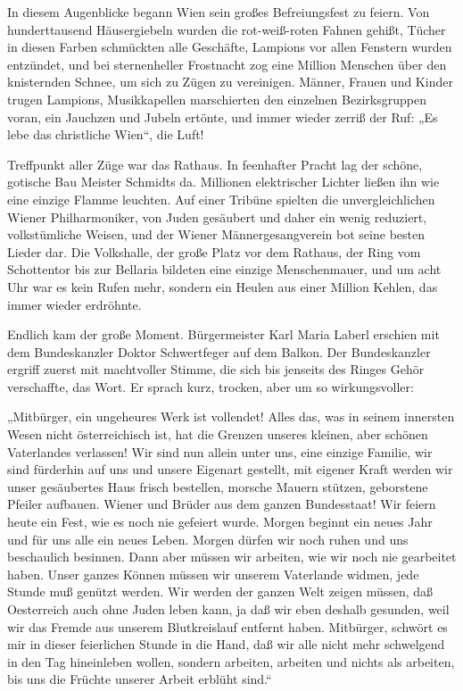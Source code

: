 In diesem Augenblicke begann Wien sein großes Befreiungsfest zu
feiern. Von hunderttausend Häusergiebeln wurden die rot-weiß-roten
Fahnen gehißt, Tücher in diesen  Farben schmückten
alle Geschäfte, Lampions vor allen Fenstern wurden entzündet, und
bei sternenheller Frostnacht zog eine Million Menschen über den
knisternden Schnee, um sich zu Zügen zu vereinigen. Männer, Frauen
und Kinder trugen Lampions, Musikkapellen marschierten den
einzelnen Bezirksgruppen voran, ein Jauchzen und Jubeln ertönte,
und immer wieder zerriß der Ruf: „Es lebe das christliche Wien“,
die Luft!

Treffpunkt aller Züge war das Rathaus. In feenhafter Pracht lag der
schöne, gotische Bau Meister Schmidts da. Millionen elektrischer
Lichter ließen ihn wie eine einzige Flamme leuchten. Auf einer
Tribüne spielten die unvergleichlichen Wiener Philharmoniker, von
Juden gesäubert und daher ein wenig reduziert, volkstümliche
Weisen, und der Wiener Männergesangverein bot seine besten Lieder
dar. Die Volkshalle, der große Platz vor dem Rathaus, der Ring vom
Schottentor bis zur Bellaria bildeten eine einzige Menschenmauer,
und um acht Uhr war es kein Rufen mehr, sondern ein Heulen aus
einer Million Kehlen, das immer wieder erdröhnte.

Endlich kam der große Moment. Bürgermeister Karl Maria Laberl
erschien mit dem Bundeskanzler Doktor Schwertfeger auf dem Balkon.
Der Bundeskanzler ergriff zuerst mit machtvoller Stimme, die sich
bis jenseits des Ringes Gehör verschaffte, das Wort. Er sprach
kurz, trocken, aber um so wirkungsvoller:

„Mitbürger, ein ungeheures Werk ist vollendet! Alles das, was in
seinem innersten Wesen nicht österreichisch ist, 
hat die Grenzen unseres kleinen, aber schönen Vaterlandes
verlassen! Wir sind nun allein unter uns, eine einzige Familie, wir
sind fürderhin auf uns und unsere Eigenart gestellt, mit eigener
Kraft werden wir unser gesäubertes Haus frisch bestellen, morsche
Mauern stützen, geborstene Pfeiler aufbauen. Wiener und Brüder aus
dem ganzen Bundesstaat! Wir feiern heute ein Fest, wie es noch nie
gefeiert wurde. Morgen beginnt ein neues Jahr und für uns alle ein
neues Leben. Morgen dürfen wir noch ruhen und uns beschaulich
besinnen. Dann aber müssen wir arbeiten, wie wir noch nie
gearbeitet haben. Unser ganzes Können müssen wir unserem Vaterlande
widmen, jede Stunde muß genützt werden. Wir werden der ganzen Welt
zeigen müssen, daß Oesterreich auch ohne Juden leben kann, ja daß
wir eben deshalb gesunden, weil wir das Fremde aus unserem
Blutkreislauf entfernt haben. Mitbürger, schwört es mir in dieser
feierlichen Stunde in die Hand, daß wir alle nicht mehr schwelgend
in den Tag hineinleben wollen, sondern arbeiten, arbeiten und
nichts als arbeiten, bis uns die Früchte unserer Arbeit erblüht
sind.“

